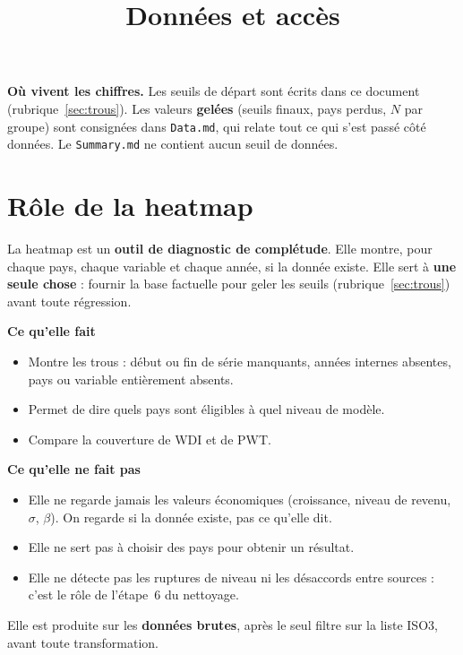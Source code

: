 \documentclass[21pt,a4paper]{article}
\title{\textbf{Données et accès}}
\author{}
\date{}
\newcommand{\sig}{\texorpdfstring{$\sigma$}{sigma}}
\newcommand{\bet}{\texorpdfstring{$\beta$}{beta}}
\begin{document}
	\maketitle
	
	\begin{encadre}
		\textbf{Où vivent les chiffres.} Les seuils de départ sont écrits dans ce document (rubrique~\ref{sec:trous}). Les valeurs \textbf{gelées} (seuils finaux, pays perdus, $N$ par groupe) sont consignées dans \texttt{Data.md}, qui relate tout ce qui s'est passé côté données. Le \texttt{Summary.md} ne contient aucun seuil de données.
	\end{encadre}
	
	\section{Rôle de la heatmap}
	
	La heatmap est un \textbf{outil de diagnostic de complétude}. Elle montre, pour chaque pays, chaque variable et chaque année, si la donnée existe. Elle sert à \textbf{une seule chose} : fournir la base factuelle pour geler les seuils (rubrique~\ref{sec:trous}) avant toute régression.
	
	\textbf{Ce qu'elle fait}
	\begin{itemize}
		\item Montre les trous : début ou fin de série manquants, années internes absentes, pays ou variable entièrement absents.
		\item Permet de dire quels pays sont éligibles à quel niveau de modèle.
		\item Compare la couverture de WDI et de PWT.
	\end{itemize}
	
	\textbf{Ce qu'elle ne fait pas}
	\begin{itemize}
		\item Elle ne regarde jamais les valeurs économiques (croissance, niveau de revenu, \sig, \bet). On regarde si la donnée existe, pas ce qu'elle dit.
		\item Elle ne sert pas à choisir des pays pour obtenir un résultat.
		\item Elle ne détecte pas les ruptures de niveau ni les désaccords entre sources : c'est le rôle de l'étape~6 du nettoyage.
	\end{itemize}
	
	Elle est produite sur les \textbf{données brutes}, après le seul filtre sur la liste ISO3, avant toute transformation.
	
\end{document}
